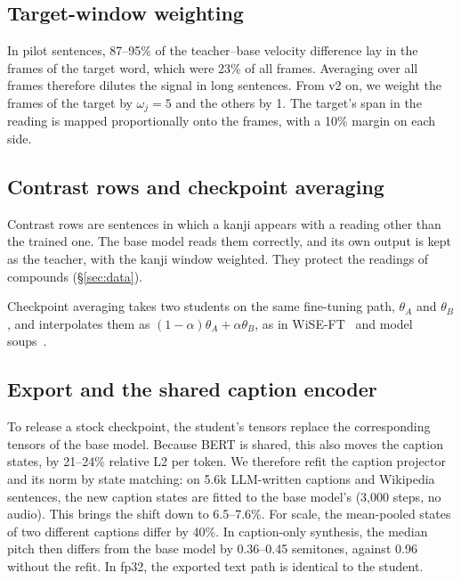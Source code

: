 \documentclass[10pt,a4paper,twocolumn]{article}
\begin{document}
\subsection{Target-window weighting}
In pilot sentences, 87--95\% of the teacher--base velocity difference lay in the frames of the
target word, which were 23\% of all frames. Averaging over all frames therefore dilutes the
signal in long sentences. From v2 on, we weight the frames of the target by
$\omega_j=5$ and the others by 1. The target's span in the reading is mapped proportionally
onto the frames, with a 10\% margin on each side.

\subsection{Contrast rows and checkpoint averaging}
Contrast rows are sentences in which a kanji appears with a reading other than the trained one.
The base model reads them correctly, and its own output is kept as the teacher, with the kanji
window weighted. They protect the readings of compounds (\S\ref{sec:data}).

Checkpoint averaging takes two students on the same fine-tuning path, $\theta_A$ and
$\theta_B$, and interpolates them as $(1-\alpha)\theta_A+\alpha\theta_B$, as in
WiSE-FT~\cite{wiseft} and model soups~\cite{soups}.

\subsection{Export and the shared caption encoder}\label{sec:export}
To release a stock checkpoint, the student's tensors replace the corresponding tensors of the
base model. Because BERT is shared, this also moves the caption states, by 21--24\% relative
L2 per token. We therefore refit the caption projector and its norm by state matching: on
5.6k LLM-written captions and Wikipedia sentences, the new caption states are fitted to the
base model's (3,000 steps, no audio). This brings the shift down to 6.5--7.6\%. For scale, the
mean-pooled states of two different captions differ by 40\%. In caption-only synthesis, the
median pitch then differs from the base model by 0.36--0.45 semitones, against 0.96 without
the refit. In fp32, the exported text path is identical to the student.
\end{document}
